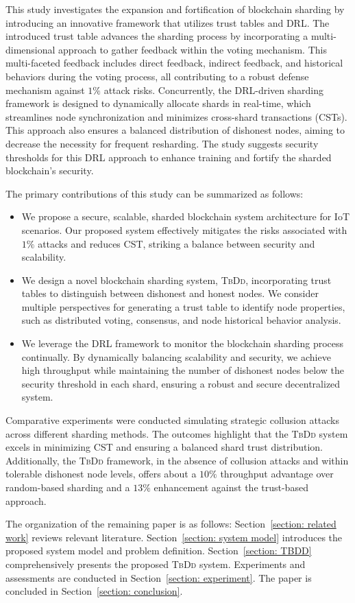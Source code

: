 This study investigates the expansion and fortification of blockchain sharding by introducing an innovative framework that utilizes trust tables and DRL. The introduced trust table advances the sharding process by incorporating a multi-dimensional approach to gather feedback within the voting mechanism. This multi-faceted feedback includes direct feedback, indirect feedback, and historical behaviors during the voting process, all contributing to a robust defense mechanism against $1\%$ attack risks. Concurrently, the DRL-driven sharding framework is designed to dynamically allocate shards in real-time, which streamlines node synchronization and minimizes cross-shard transactions (CSTs). This approach also ensures a balanced distribution of dishonest nodes, aiming to decrease the necessity for frequent resharding. The study suggests security thresholds for this DRL approach to enhance training and fortify the sharded blockchain's security.

The primary contributions of this study can be summarized as follows:

\begin{itemize}

\item We propose a secure, scalable, sharded blockchain system architecture for IoT scenarios. Our proposed system effectively mitigates the risks associated with $1\%$ attacks and reduces CST, striking a balance between security and scalability.

\item  We design a novel blockchain sharding system, \textsc{TbDd}, incorporating trust tables to distinguish between dishonest and honest nodes. We consider multiple perspectives for generating a trust table to identify node properties, such as distributed voting, consensus, and node historical behavior analysis.

\item We leverage the DRL framework to monitor the blockchain sharding process continually. By dynamically balancing scalability and security, we achieve high throughput while maintaining the number of dishonest nodes below the security threshold in each shard, ensuring a robust and secure decentralized system.
\end{itemize}

Comparative experiments were conducted simulating strategic collusion attacks across different sharding methods. The outcomes highlight that the \textsc{TbDd} system excels in minimizing CST and ensuring a balanced shard trust distribution. Additionally, the \textsc{TbDd} framework, in the absence of collusion attacks and within tolerable dishonest node levels, offers about a $10\%$ throughput advantage over random-based sharding and a $13\%$ enhancement against the trust-based approach.


The organization of the remaining paper is as follows: Section~\ref{section: related work} reviews relevant literature. Section~\ref{section: system model} introduces the proposed system model and problem definition. Section~\ref{section: TBDD} comprehensively presents the proposed \textsc{TbDd} system. Experiments and assessments are conducted in Section~\ref{section: experiment}. The paper is concluded in Section~\ref{section: conclusion}.
